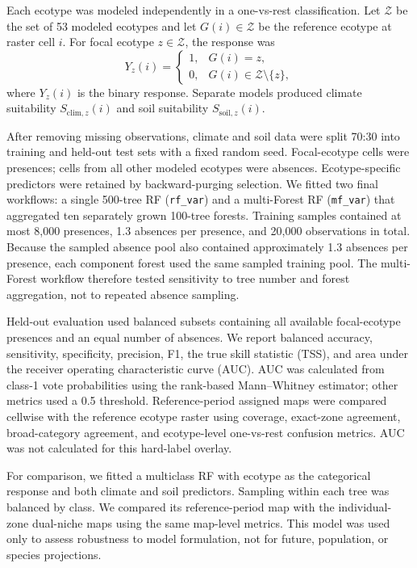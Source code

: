 \documentclass[11pt]{article}
\begin{document}
Each ecotype was modeled independently in a one-vs-rest classification. Let $\mathcal{Z}$ be the set of 53 modeled ecotypes and let $G(i)\in\mathcal{Z}$ be the reference ecotype at raster cell $i$. For focal ecotype $z\in\mathcal{Z}$, the response was
\begin{equation}
Y_z(i)=
\begin{cases}
1, & G(i)=z,\\
0, & G(i)\in\mathcal{Z}\setminus\{z\},
\end{cases}
\end{equation}
where $Y_z(i)$ is the binary response. Separate models produced climate suitability $S_{\mathrm{clim},z}(i)$ and soil suitability $S_{\mathrm{soil},z}(i)$.

After removing missing observations, climate and soil data were split 70:30 into training and held-out test sets with a fixed random seed. Focal-ecotype cells were presences; cells from all other modeled ecotypes were absences. Ecotype-specific predictors were retained by backward-purging selection. We fitted two final workflows: a single 500-tree RF (\texttt{rf\_var}) and a multi-Forest RF (\texttt{mf\_var}) that aggregated ten separately grown 100-tree forests. Training samples contained at most 8,000 presences, 1.3 absences per presence, and 20,000 observations in total. Because the sampled absence pool also contained approximately 1.3 absences per presence, each component forest used the same sampled training pool. The multi-Forest workflow therefore tested sensitivity to tree number and forest aggregation, not to repeated absence sampling.

Held-out evaluation used balanced subsets containing all available focal-ecotype presences and an equal number of absences. We report balanced accuracy, sensitivity, specificity, precision, F1, the true skill statistic (TSS), and area under the receiver operating characteristic curve (AUC). AUC was calculated from class-1 vote probabilities using the rank-based Mann--Whitney estimator; other metrics used a 0.5 threshold. Reference-period assigned maps were compared cellwise with the reference ecotype raster using coverage, exact-zone agreement, broad-category agreement, and ecotype-level one-vs-rest confusion metrics. AUC was not calculated for this hard-label overlay.

For comparison, we fitted a multiclass RF with ecotype as the categorical response and both climate and soil predictors. Sampling within each tree was balanced by class. We compared its reference-period map with the individual-zone dual-niche maps using the same map-level metrics. This model was used only to assess robustness to model formulation, not for future, population, or species projections.
\end{document}
